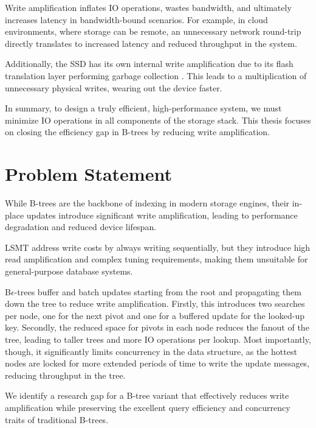 Write amplification inflates \ac{IO} operations, wastes bandwidth, and ultimately increases latency in bandwidth-bound scenarios.
For example, in cloud environments, where storage can be remote, an unnecessary network round-trip directly translates to increased latency and reduced throughput in the system.

Additionally, the \ac{SSD} has its own internal write amplification due to its flash translation layer performing garbage collection \cite{haas2023modern}. 
This leads to a multiplication of unnecessary physical writes, wearing out the device faster.

In summary, to design a truly efficient, high-performance system, we must minimize \ac{IO} operations in all components of the storage stack. 
This thesis focuses on closing the efficiency gap in B-trees by reducing write amplification.

\section{Problem Statement}
While B-trees are the backbone of indexing in modern storage engines, their in-place updates introduce significant write amplification, leading to performance degradation and reduced device lifespan. 

\ac{LSMT} address write costs by always writing sequentially, but they introduce high read amplification and complex tuning requirements, making them unsuitable for general-purpose database systems.

B$\epsilon$-trees buffer and batch updates starting from the root and propagating them down the tree to reduce write amplification. 
Firstly, this introduces two searches per node, one for the next pivot and one for a buffered update for the looked-up key.
Secondly, the reduced space for pivots in each node reduces the fanout of the tree, leading to taller trees and more \ac{IO} operations per lookup.
Most importantly, though, it significantly limits concurrency in the data structure, as the hottest nodes are locked for more extended periods of time to write the update messages, reducing throughput in the tree.

We identify a research gap for a B-tree variant that effectively reduces write amplification while preserving the excellent query efficiency and concurrency traits of traditional B-trees.


